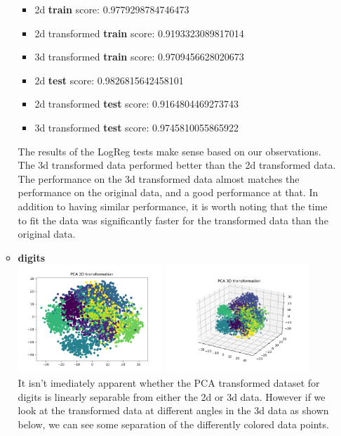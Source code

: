 \documentclass[12pt]{article}
\begin{document}
\begin{enumerate}[leftmargin=\parindent,align=left,labelwidth=\parindent,noitemsep]
\begin{itemize}[topsep=10pt]
\begin{itemize}
        \item 2d \textbf{train} score: 0.9779298784746473
        \item 2d transformed \textbf{train} score: 0.9193323089817014
        \item 3d transformed \textbf{train} score: 0.9709456628020673 \\

        \item 2d \textbf{test} score: 0.9826815642458101
        \item 2d transformed \textbf{test} score: 0.9164804469273743
        \item 3d transformed \textbf{test} score: 0.9745810055865922
    \end{itemize}
    The results of the LogReg tests make sense based on our observations. The 3d transformed data performed better than the 2d transformed data. The performance on the 3d transformed data almost matches the performance on the original data, and a good performance at that. In addition to having similar performance, it is worth noting that the time to fit the data was significantly faster for the transformed data than the original data.
    \item \textbf{digits} \\
    \includegraphics[width=0.45\textwidth]{pca_digits_2d}
    \includegraphics[width=0.45\textwidth]{pca_digits_3d} \\
    It isn't imediately apparent whether the PCA transformed dataset for digits is linearly separable from either the 2d or 3d data. However if we look at the transformed data at different angles in the 3d data as shown below, we can see some separation of the differently colored data points. \\

\end{itemize}
\end{enumerate}
\end{document}
